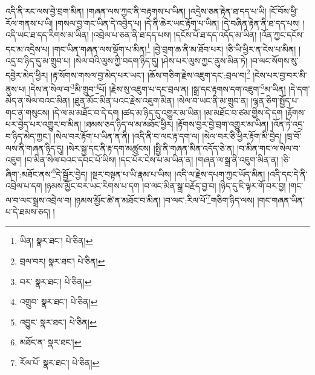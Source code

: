 འདི་ནི་རང་ལས་བྱེ་བྲག་མིན། །གཞན་ལས་ཀྱང་ནི་བརྟགས་པ་ཡིན། །འདྲེས་ཅན་རྟེན་ཐ་དད་པ་ཡི། །ངོ་བོས་ཕྱི་རོལ་གནས་པ་ཡི། །གསལ་བྱ་གང་ཡིན་དེ་འབྱེད་པ། །དེ་ནི་ཆེར་ཡང་རྟོག་པ་ཡིན། །དེ་བཞིན་རྟེན་ནི་ཐ་དད་པས། །འདི་ཡང་ཐ་དད་རིགས་མ་ཡིན། །འབྲེལ་པ་ཅན་ནི་ཐ་དད་པས། །དངོས་པོ་ཐ་དད་འདོད་མ་ཡིན། །འོན་ཀྱང་དངོས་དང་མ་འདྲེས་པ། །གང་ཡིན་གཞན་ལས་ལྡོག་པ་མིན།\footnote{ཡིན།  སྣར་ཐང་།  པེ་ཅིན། } །བྱེ་བྲག་ཆ་ནི་མ་ཐོབ་པར། །ཅི་ཡི་ཕྱིར་ན་ངེས་པ་མིན། །འདྲ་བ་ཉིད་དུ་མ་གྲུབ་པ། །སེལ་བའི་ལུས་ཀྱི་བདག་ཉིད་དུ། །ཤེས་པར་ལུས་ཀྱང་ནུས་མིན་ཏེ། །བ་ལང་སོགས་སུ་དབྱེར་མེད་ཕྱིར། །རྟ་སོགས་གསལ་བྱ་མེད་པར་ཡང་། །ཆོས་གཅིག་རྗེས་འཇུག་དང་:བྲལ་བ།\footnote{བྲལ་བར།  སྣར་ཐང་།  པེ་ཅིན། } །ངེས་པར་བྱ་བར་མི་ནུས་པ། །དེས་ན་སེལ་བ་\footnote{བར་  སྣར་ཐང་།  པེ་ཅིན། }མི་གྲུབ་\footnote{འགྲུབ་  སྣར་ཐང་།  པེ་ཅིན། }པོ། །རྗེས་སུ་འཇུག་པ་དང་བྲལ་ན། །སྒྲ་དང་རྟགས་དག་འཇུག་\footnote{འབྱུང་  སྣར་ཐང་།  པེ་ཅིན། }མ་ཡིན། །དེ་དག་མེད་ན་སེལ་བའང་མིན། །ཐུན་མོང་མིན་པའང་རྗེས་འཇུག་མིན། །སེལ་བ་ཡང་ནི་མ་གྲུབ་ན། །ལྷན་ཅིག་སྤྱོད་པ་གང་ན་གསུངས། །དེ་ལ་མ་མཐོང་བ་དེ་དག །ཚད་མ་ཉིད་དུ་འགྱུར་མ་ཡིན། །མ་མཐོང་བ་ཙམ་གྱིས་དེ་དག །རྟོགས་པར་བྱེད་པར་འགྱུར་བ་མིན། །ཐམས་ཅད་ཉིད་ལ་མ་མཐོང་ཕྱིར། །རྟོགས་བྱར་བྱེ་བྲག་འགྱུར་མ་ཡིན། །འོན་ཏེ་འདྲ་བ་ཉིད་མེད་ཀྱང་། །སེལ་བར་རྟོག་པ་ཡིན་ན་ནི། །འདི་ནི་བ་ལང་རྟ་དག་ལ། །སེལ་བར་ཅི་ཕྱིར་རྟོག་མི་བྱེད། །ཁྲ་བོ་ལས་ནི་གཞན་ཉིད་དུ། །སེར་སྐྱ་དང་ནི་རྟ་དག་མཚུངས། །སྤྱི་ནི་གཞན་མིན་འདོད་ཅེ་ན། །བ་མིན་གང་ལ་སེལ་བ་འཇུག །བ་མིན་སེལ་བའང་དབང་པོ་ཡིས། །དང་པོར་ངེས་པ་མ་ཡིན་ན། །གཞན་ལ་སྒྲ་ནི་འཇུག་མིན་ན། །ཅི་ཞིག་:མཐོང་ནས་\footnote{མཐོང་ན་  སྣར་ཐང་། }དེ་སྦྱོར་བྱེད། །སྔར་བསྟན་པ་ཡི་རྣམ་པ་ཡིས། །འདི་ལ་རྗེས་དཔག་ཀྱང་ཡོད་མིན། །འདི་དང་དེ་ནི་འབྲེལ་པ་དག །ཉམས་མྱོང་བར་ཡང་རིགས་པ་དག །བ་ལང་མིན་སྒྲ་བརྗོད་བྱ་བ། །ཉིད་དུ་ཇི་ལྟར་གོ་བར་བྱ། །གང་ལ་བ་ལང་སྒྲས་འབྲེལ་བ། །ཉམས་མྱོང་ཚེ་ན་མཐོང་བ་མིན། །བ་ལང་:རིལ་པོ་\footnote{རོལ་པོ་  སྣར་ཐང་།  པེ་ཅིན། }གཅིག་ཉིད་ལས། །གང་གཞན་ཡིན་པ་དེ་ཐམས་ཅད། །
